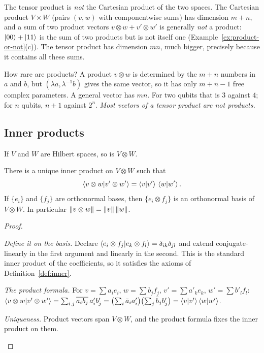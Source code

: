 \begin{pitfall}
  The tensor product is \emph{not} the Cartesian product of the two spaces. The Cartesian product $V\times W$ (pairs $(v,w)$ with componentwise sums) has dimension $m+n$, and a sum of two product vectors $v\otimes w+v'\otimes w'$ is generally \emph{not} a product: $\left|00\right\rangle+\left|11\right\rangle$ is the sum of two products but is not itself one (Example~\ref{ex:product-or-not}(c)). The tensor product has dimension $mn$, much bigger, precisely because it contains all these sums.
\end{pitfall}

How rare are products? A product $v\otimes w$ is determined by the $m+n$ numbers in $a$ and $b$, but $(\lambda a,\lambda^{-1}b)$ gives the same vector, so it has only $m+n-1$ free complex parameters. A general vector has $mn$. For two qubits that is $3$ against $4$; for $n$ qubits, $n+1$ against $2^n$. \emph{Most vectors of a tensor product are not products.}

\subsection{Inner products}

If $V$ and $W$ are Hilbert spaces, so is $V\otimes W$.

\begin{proposition}\label{prop:tensor-inner}
  There is a unique inner product on $V\otimes W$ such that
  \[
    \left\langle v\otimes w\middle|v'\otimes w'\right\rangle=\left\langle v\middle|v'\right\rangle\,\left\langle w\middle|w'\right\rangle.
  \]
  If $\{e_i\}$ and $\{f_j\}$ are orthonormal bases, then $\{e_i\otimes f_j\}$ is an orthonormal basis of $V\otimes W$. In particular $\left\|v\otimes w\right\|=\left\|v\right\|\left\|w\right\|$.
\end{proposition}
\begin{proof}
  \begin{steps}
    \item \emph{Define it on the basis.} Declare $\left\langle e_i\otimes f_j\middle|e_k\otimes f_l\right\rangle=\delta_{ik}\delta_{jl}$ and extend conjugate-linearly in the first argument and linearly in the second. This is the standard inner product of the coefficients, so it satisfies the axioms of Definition~\ref{def:inner}.
    \item \emph{The product formula.} For $v=\sum a_ie_i$, $w=\sum b_jf_j$, $v'=\sum a'_ke_k$, $w'=\sum b'_lf_l$: $\left\langle v\otimes w\middle|v'\otimes w'\right\rangle=\sum_{i,j}\overline{a_ib_j}\,a'_ib'_j=\bigl(\sum_i\bar a_ia'_i\bigr)\bigl(\sum_j\bar b_jb'_j\bigr)=\left\langle v\middle|v'\right\rangle\left\langle w\middle|w'\right\rangle$.
    \item \emph{Uniqueness.} Product vectors span $V\otimes W$, and the product formula fixes the inner product on them. \qedhere
  \end{steps}
\end{proof}

